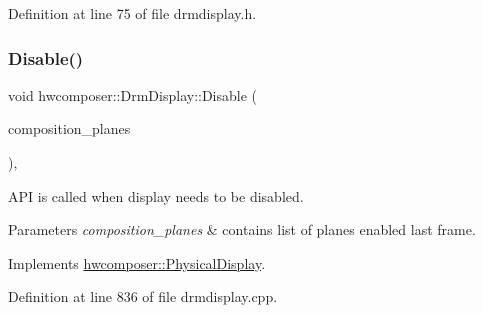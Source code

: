 Definition at line 75 of file drmdisplay.\+h.


\begin{DoxyCode}{0}
\end{DoxyCode}
\mbox{\label{classhwcomposer_1_1DrmDisplay_a4596c2736f70fdd4c87ceb2dccf14848}} 
\subsubsection{\texorpdfstring{Disable()}{Disable()}}
{\footnotesize\ttfamily void hwcomposer\+::\+Drm\+Display\+::\+Disable (\begin{DoxyParamCaption}\item[{const \mbox{\hyperlink{namespacehwcomposer_adf383ae435d39a5631a8ad82e7fa18a4}{Display\+Plane\+State\+List}} \&}]{composition\+\_\+planes }\end{DoxyParamCaption})\hspace{0.3cm}{\ttfamily [override]}, {\ttfamily [virtual]}}

A\+PI is called when display needs to be disabled. 
\begin{DoxyParams}{Parameters}
{\em composition\+\_\+planes} & contains list of planes enabled last frame. \\
\hline
\end{DoxyParams}


Implements \mbox{\hyperlink{classhwcomposer_1_1PhysicalDisplay_af309ebed456ecdf3eb935ce693f326d1}{hwcomposer\+::\+Physical\+Display}}.



Definition at line 836 of file drmdisplay.\+cpp.


